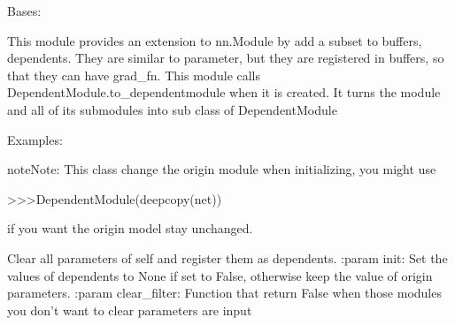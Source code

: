 \documentclass[letterpaper,10pt,english]{sphinxmanual}
\begin{document}
\begin{fulllineitems}
\label{\detokenize{metann:metann.DependentModule}}
Bases: 

This module provides an extension to nn.Module by add a subset to buffers, dependents. They are similar to parameter,
but they are registered in buffers, so that they can have grad\_fn.
This module calls DependentModule.to\_dependentmodule when it is created. It turns the module and all of its
submodules into sub class of DependentModule

Examples:

\begin{sphinxVerbatim}[commandchars=\\\{\}]
\end{sphinxVerbatim}

\begin{sphinxadmonition}{note}{Note:}
This class change the origin module when initializing, you might use

\textgreater{}\textgreater{}\textgreater{}DependentModule(deepcopy(net))

if you want the origin model stay unchanged.
\end{sphinxadmonition}

\begin{fulllineitems}
\label{\detokenize{metann:metann.DependentModule.clear_params}}
Clear all parameters of self and register them as dependents.
:param init: Set the values of dependents to None if set to False, otherwise keep the value of origin parameters.
:param clear\_filter: Function that return False when those modules you don’t want to clear parameters are input


\end{fulllineitems}
\end{fulllineitems}
\end{document}

